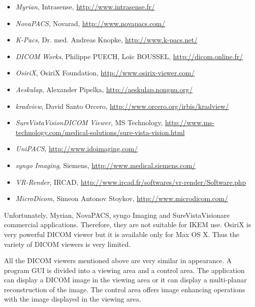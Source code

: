 \begin{itemize}
  \setlength{\itemsep}{0pt}
  \setlength{\parskip}{0pt}
  \setlength{\parsep}{0pt}
\item \emph{Myrian}, Intrasense, \url{http://www.intrasense.fr/}
\item \emph{NovaPACS}, Novarad, \url{http://www.novapacs.com/}
\item \emph{K-Pacs}, Dr. med. Andreas Knopke, \url{http://www.k-pacs.net/}
\item \emph{DICOM Works}, Philippe PUECH, Loïc BOUSSEL, \url{http://dicom.online.fr/}
\item \emph{OsiriX}, OsiriX Foundation, \url{http://www.osirix-viewer.com/}
\item \emph{Aeskulap}, Alexander Pipelka, \url{http://aeskulap.nongnu.org/}
\item \emph{kradview}, David Santo Orcero, \url{http://www.orcero.org/irbis/kradview/}
\item \emph{SureVistaVision\texttrademark DICOM Viewer}, MS Technology, \url{http://www.ms-technology.com/medical-solutions/sure-vista-vision.html}
\item \emph{UniPACS},  \url{http://www.idoimaging.com/}
\item \emph{syngo Imaging}, Siemens, \url{http://www.medical.siemens.com/}
\item \emph{VR-Render}, IRCAD, \url{http://www.ircad.fr/softwares/vr-render/Software.php}
\item \emph{MicroDicom}, Simeon Antonov Stoykov, \url{http://www.microdicom.com/}
\end{itemize}

Unfortunately, Myrian, NovaPACS, syngo Imaging and SureVistaVision\texttrademark are commercial applications. Therefore, they are not suitable for IKEM use. OsiriX is very powerful DICOM viewer but it is available only for Max OS X. Thus the variety of DICOM viewers is very limited.

All the DICOM viewers mentioned above are very similar in appearance. A program GUI is divided into a viewing area and a control area. The application can display a DICOM image in the viewing area or it can display a multi-planar reconstruction of the image. The control area offers image enhancing operations with the image displayed in the viewing area.

